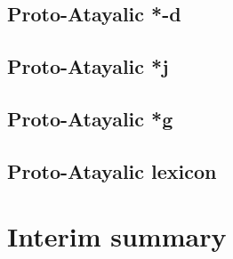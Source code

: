 \subsection{Proto-Atayalic *-d}
\lipsum[1]
\subsection{Proto-Atayalic *j}
\lipsum[1]
\subsection{Proto-Atayalic *g}
\lipsum[1]
\subsection{Proto-Atayalic lexicon}
\lipsum[1]

\section{Interim summary}
\lipsum[1]